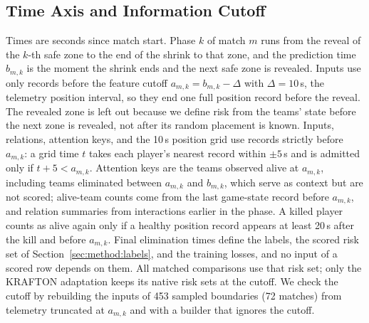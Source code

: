 \documentclass[sigconf,anonymous]{acmart}
\begin{document}
\subsection{Time Axis and Information Cutoff}
\label{sec:method:samples}
Times are seconds since match start. Phase $k$ of match $m$ runs from the reveal of the $k$-th safe zone to the end of the shrink to that zone, and the prediction time $b_{m,k}$ is the moment the shrink ends and the next safe zone is revealed. Inputs use only records before the feature cutoff $a_{m,k}=b_{m,k}-\Delta$ with $\Delta=10$\,s, the telemetry position interval, so they end one full position record before the reveal. The revealed zone is left out because we define risk from the teams' state before the next zone is revealed, not after its random placement is known. Inputs, relations, attention keys, and the 10\,s position grid use records strictly before $a_{m,k}$: a grid time $t$ takes each player's nearest record within $\pm5$\,s and is admitted only if $t+5<a_{m,k}$. Attention keys are the teams observed alive at $a_{m,k}$, including teams eliminated between $a_{m,k}$ and $b_{m,k}$, which serve as context but are not scored; alive-team counts come from the last game-state record before $a_{m,k}$, and relation summaries from interactions earlier in the phase. A killed player counts as alive again only if a healthy position record appears at least 20\,s after the kill and before $a_{m,k}$. Final elimination times define the labels, the scored risk set of Section~\ref{sec:method:labels}, and the training losses, and no input of a scored row depends on them. All matched comparisons use that risk set; only the KRAFTON adaptation keeps its native risk sets at the cutoff. We check the cutoff by rebuilding the inputs of 453 sampled boundaries (72 matches) from telemetry truncated at $a_{m,k}$ and with a builder that ignores the cutoff.
\end{document}
